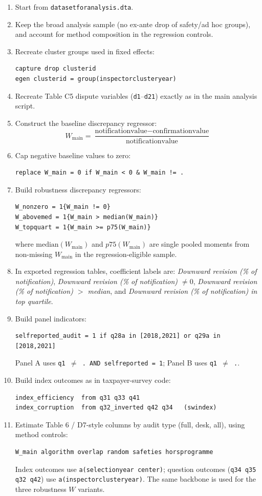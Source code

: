 \begin{enumerate}
\item Start from \texttt{datasetforanalysis.dta}.
\item Keep the broad analysis sample (no ex-ante drop of safety/ad hoc groups), and account for method composition in the regression controls.
\item Recreate cluster groups used in fixed effects:
\begin{verbatim}
capture drop clusterid
egen clusterid = group(inspectorclusteryear)
\end{verbatim}
\item Recreate Table C5 dispute variables (\texttt{d1}--\texttt{d21}) exactly as in the main analysis script.
\item Construct the baseline discrepancy regressor:
\[
W_{\text{main}}=\frac{\text{notificationvalue}-\text{confirmationvalue}}{\text{notificationvalue}}
\]
\item Cap negative baseline values to zero:
\begin{verbatim}
replace W_main = 0 if W_main < 0 & W_main != .
\end{verbatim}
\item Build robustness discrepancy regressors:
\begin{verbatim}
W_nonzero = 1{W_main != 0}
W_abovemed = 1{W_main > median(W_main)}
W_topquart = 1{W_main >= p75(W_main)}
\end{verbatim}
where \(\text{median}(W_{\text{main}})\) and \(p75(W_{\text{main}})\) are single pooled moments from non-missing \(W_{\text{main}}\) in the regression-eligible sample.
\item In exported regression tables, coefficient labels are:
\textit{Downward revision (\% of notification)},
\textit{Downward revision (\% of notification) $\neq 0$},
\textit{Downward revision (\% of notification) $>$ median}, and
\textit{Downward revision (\% of notification) in top quartile}.
\item Build panel indicators:
\begin{verbatim}
selfreported_audit = 1 if q28a in [2018,2021] or q29a in [2018,2021]
\end{verbatim}
Panel A uses \texttt{q1 $\neq$ . AND selfreported  = 1}; Panel B uses \texttt{q1 $\neq$ .}.
\item Build index outcomes as in taxpayer-survey code:
\begin{verbatim}
index_efficiency  from q31 q33 q41
index_corruption  from q32_inverted q42 q34   (swindex)
\end{verbatim}
\item Estimate Table 6 / D7-style columns by audit type (full, desk, all), using method controls:
\begin{verbatim}
W_main algorithm overlap random safeties horsprogramme
\end{verbatim}
Index outcomes use \texttt{a(selectionyear center)}; question outcomes (\texttt{q34 q35 q32 q42}) use \texttt{a(inspectorclusteryear)}. The same backbone is used for the three robustness \(W\) variants.
\end{enumerate}

